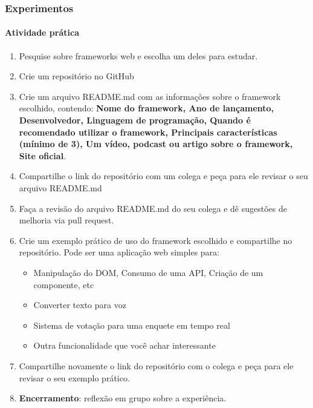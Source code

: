 \documentclass[
	9pt, %
	t, %
]{beamer}
\begin{document}
\begin{frame}
	\frametitle{Experimentos}
	\framesubtitle{Atividade prática}

	\begin{enumerate}
		\item Pesquise sobre frameworks web e escolha um deles para estudar.
		\item Crie um repositório no GitHub
		\item Crie um arquivo README.md com as informações sobre o framework escolhido, contendo: {\small \textbf{Nome do framework, Ano de lançamento, Desenvolvedor, Linguagem de programação, Quando é recomendado utilizar o framework, Principais características (mínimo de 3), Um vídeo, podcast ou artigo sobre o framework, Site oficial}}.
		\item Compartilhe o link do repositório com um colega e peça para ele revisar o seu arquivo README.md
		\item Faça a revisão do arquivo README.md do seu colega e dê sugestões de melhoria via pull request.
		\item Crie um exemplo prático de uso do framework escolhido e compartilhe no repositório. Pode ser uma aplicação web simples para:
		\begin{itemize}
			\item Manipulação do DOM, Consumo de uma API, Criação de um componente, etc
			\item Converter texto para voz
			\item Sistema de votação para uma enquete em tempo real
			\item Outra funcionalidade que você achar interessante
		\end{itemize}
		\item Compartilhe novamente o link do repositório com o colega e peça para ele revisar o seu exemplo prático.
		\item \textbf{Encerramento}: reflexão em grupo sobre a experiência.
	\end{enumerate}

\end{frame}
\end{document}
